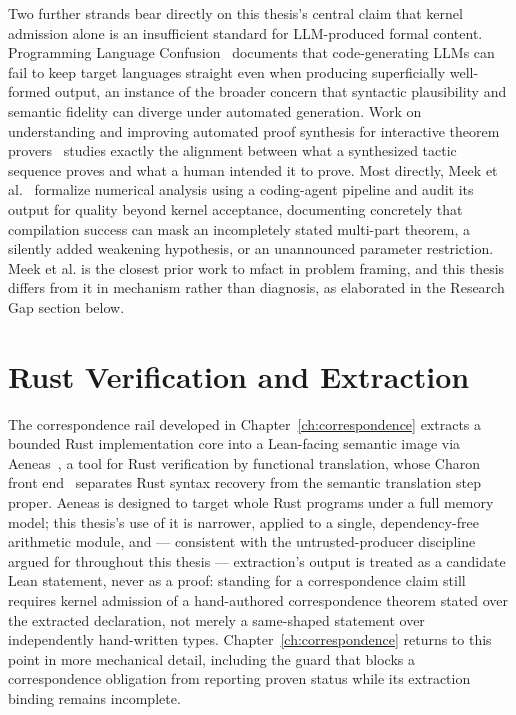 Two further strands bear directly on this thesis's central claim that
kernel admission alone is an insufficient standard for LLM-produced
formal content. Programming Language Confusion~\cite{langconfusion2025}
documents that code-generating LLMs can fail to keep target languages
straight even when producing superficially well-formed output, an
instance of the broader concern that syntactic plausibility and semantic
fidelity can diverge under automated generation. Work on understanding
and improving automated proof synthesis for interactive theorem
provers~\cite{tacticexpertalign2026} studies exactly the alignment
between what a synthesized tactic sequence proves and what a human
intended it to prove. Most directly, Meek et al.~\cite{meek2026formalizing}
formalize numerical analysis using a coding-agent pipeline and audit its
output for quality beyond kernel acceptance, documenting concretely that
compilation success can mask an incompletely stated multi-part theorem,
a silently added weakening hypothesis, or an unannounced parameter
restriction. Meek et al. is the closest prior work to \textsf{mfact} in
problem framing, and this thesis differs from it in mechanism rather
than diagnosis, as elaborated in the Research Gap section below.

\section{Rust Verification and Extraction}

The correspondence rail developed in Chapter~\ref{ch:correspondence}
extracts a bounded Rust implementation core into a Lean-facing semantic
image via Aeneas~\cite{ho2022aeneas}, a tool for Rust verification by
functional translation, whose Charon front end~\cite{protzenko2024charon}
separates Rust syntax recovery from the semantic translation step
proper. Aeneas is designed to target whole Rust programs under a full
memory model; this thesis's use of it is narrower, applied to a single,
dependency-free arithmetic module, and --- consistent with the
untrusted-producer discipline argued for throughout this thesis ---
extraction's output is treated as a candidate Lean statement, never as a
proof: standing for a correspondence claim still requires kernel
admission of a hand-authored correspondence theorem stated over the
extracted declaration, not merely a same-shaped statement over
independently hand-written types. Chapter~\ref{ch:correspondence}
returns to this point in more mechanical detail, including the guard
that blocks a correspondence obligation from reporting proven status
while its extraction binding remains incomplete.

